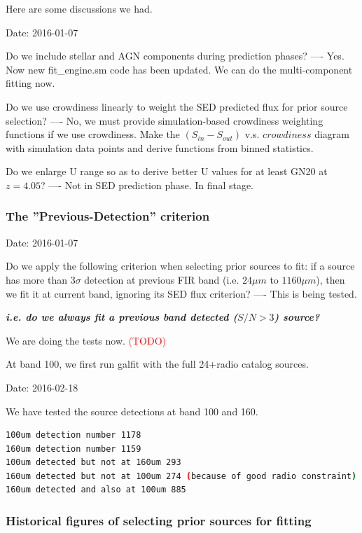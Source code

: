 \documentclass[11pt,a4paper]{article}
\begin{document}
Here are some discussions we had. 

\textcolor{green!90!black!60!orange}{Date: 2016-01-07}

Do we include stellar and AGN components during prediction phases? ---- Yes. Now new fit\_engine.sm code has been updated. We can do the multi-component fitting now. 

Do we use crowdiness linearly to weight the SED predicted flux for prior source selection? ---- No, we must provide simulation-based crowdiness weighting functions if we use crowdiness. Make the $(S_{in}-S_{out})$ v.s. $crowdiness$ diagram with simulation data points and derive functions from binned statistics. 

Do we enlarge U range so as to derive better U values for at least GN20 at $z=4.05$? ---- Not in SED prediction phase. In final stage. 

\subsubsection{The ''Previous-Detection'' criterion}

\textcolor{green!90!black!60!orange}{Date: 2016-01-07}

Do we apply the following criterion when selecting prior sources to fit: if a source has more than $3\sigma$ detection at previous FIR band (i.e. $24{\mu}m$ to $1160{\mu}m$), then we fit it at current band, ignoring its SED flux criterion? ---- This is being tested. 

\textit{\textbf{i.e. do we always fit a previous band detected ($S/N>3$) source?}}

We are doing the tests now.
\textcolor{red}{(TODO)}

At band 100, we first run galfit with the full 24+radio catalog sources. 

\textcolor{green!90!black!60!orange}{Date: 2016-02-18}

We have tested the source detections at band 100 and 160. 
\begin{lstlisting}[language=bash]
100um detection number 1178
160um detection number 1159
100um detected but not at 160um 293
160um detected but not at 100um 274 (because of good radio constraint)
160um detected and also at 100um 885
\end{lstlisting}

\subsubsection{Historical figures of selecting prior sources for fitting}
\end{document}
